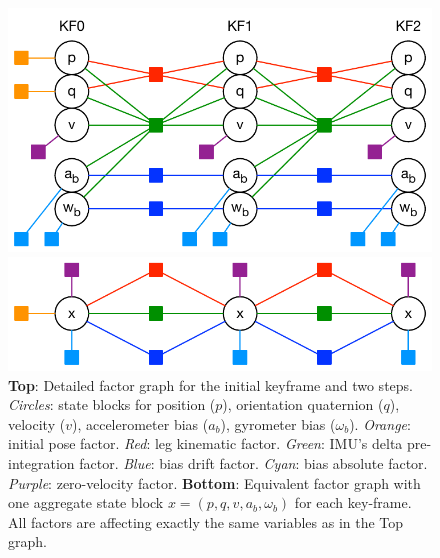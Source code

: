\begin{figure}[tb]
\begin{center}
\includegraphics[scale=0.65]{figures/graph_exploded}
\par\vspace{4mm}
\includegraphics[scale=0.65]{figures/graph_essential}
\caption{
{\bf Top}: Detailed factor graph for the initial keyframe and two steps. \emph{Circles}: state blocks for position ($p$), orientation quaternion ($q$), velocity ($v$), accelerometer bias ($a_b$), gyrometer bias ($\omega_b$). \emph{Orange}: initial pose factor. \emph{Red}: leg kinematic factor. \emph{Green}: IMU's delta pre-integration factor. 
\emph{Blue}: bias drift factor. \emph{Cyan}: bias absolute factor. \emph{Purple}: zero-velocity factor. 
{\bf Bottom}: Equivalent factor graph with one aggregate state block $x=(p,q,v,a_b,\omega_b)$ for each key-frame. All factors are affecting exactly the same variables as in the Top graph.
}
\label{default}
\end{center}
\end{figure}


